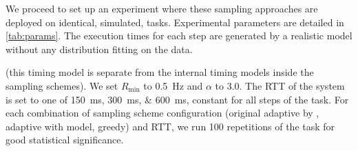 We proceed to set up an experiment where these sampling approaches are deployed on identical, simulated, tasks.
Experimental parameters are detailed in \cref{tab:params}.
The execution times for each step are generated by a realistic model without any distribution fitting on the data.

 (this timing model is separate from the internal timing models inside the sampling schemes).
We set \( R_\text{min} \) to \SI{0.5}{\hertz} and \( \alpha \) to \num{3.0}.
The \ac{RTT} of the system is set to one of \SIlist[list-final-separator={, or}]{150;300;600}{\milli\second}, constant for all steps of the task.
For each combination of sampling scheme configuration (original adaptive by \textcite{Wang2019Towards}, adaptive with \edgedroid{} model, greedy) and \ac{RTT}, we run \num{100} repetitions of the task for good statistical significance.

